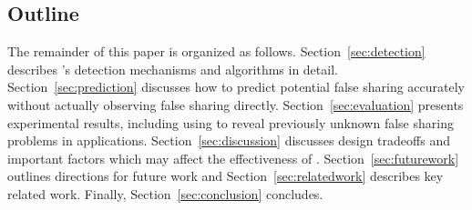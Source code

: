 \subsection*{Outline}

The remainder of this paper is organized as follows. 
Section~\ref{sec:detection} describes \Predator{}'s detection mechanisms and algorithms in detail. Section~\ref{sec:prediction} discusses how to predict potential false sharing accurately without actually observing false sharing directly. Section~\ref{sec:evaluation} presents experimental results, including using \Predator{} to reveal previously unknown false sharing problems in applications. 
Section~\ref{sec:discussion} discusses design tradeoffs and important factors which may affect the effectiveness of \Predator{}. 
Section~\ref{sec:futurework} outlines directions for future work and Section~\ref{sec:relatedwork} describes key related work. Finally, Section~\ref{sec:conclusion} concludes.
